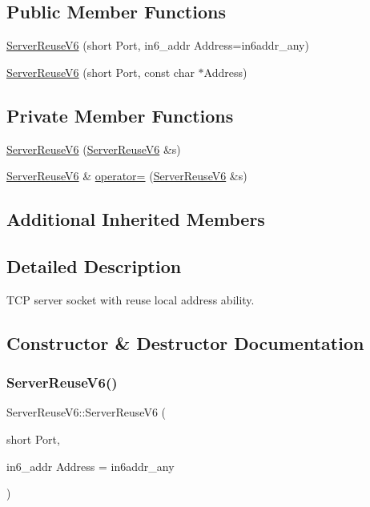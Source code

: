 \subsection*{Public Member Functions}
\begin{DoxyCompactItemize}
\item 
\hyperlink{classServerReuseV6_ab18b2c131544cff19092e079cad65183}{Server\+Reuse\+V6} (short Port, in6\+\_\+addr Address=in6addr\+\_\+any)
\item 
\hyperlink{classServerReuseV6_aede672796d4fd33b27682fd6b0120ae2}{Server\+Reuse\+V6} (short Port, const char $\ast$Address)
\end{DoxyCompactItemize}
\subsection*{Private Member Functions}
\begin{DoxyCompactItemize}
\item 
\hyperlink{classServerReuseV6_a84ece67785e19d6ff31b002aa88d2bff}{Server\+Reuse\+V6} (\hyperlink{classServerReuseV6}{Server\+Reuse\+V6} \&s)
\item 
\hyperlink{classServerReuseV6}{Server\+Reuse\+V6} \& \hyperlink{classServerReuseV6_af517a336f3c8f9166ee1cc70e2e6a5f4}{operator=} (\hyperlink{classServerReuseV6}{Server\+Reuse\+V6} \&s)
\end{DoxyCompactItemize}
\subsection*{Additional Inherited Members}


\subsection{Detailed Description}
T\+CP server socket with reuse local address ability. 

\subsection{Constructor \& Destructor Documentation}
\mbox{\label{classServerReuseV6_ab18b2c131544cff19092e079cad65183}} 
\subsubsection{\texorpdfstring{Server\+Reuse\+V6()}{ServerReuseV6()}\hspace{0.1cm}{\footnotesize\ttfamily [1/3]}}
{\footnotesize\ttfamily Server\+Reuse\+V6\+::\+Server\+Reuse\+V6 (\begin{DoxyParamCaption}\item[{short}]{Port,  }\item[{in6\+\_\+addr}]{Address = {\ttfamily in6addr\+\_\+any} }\end{DoxyParamCaption})}

